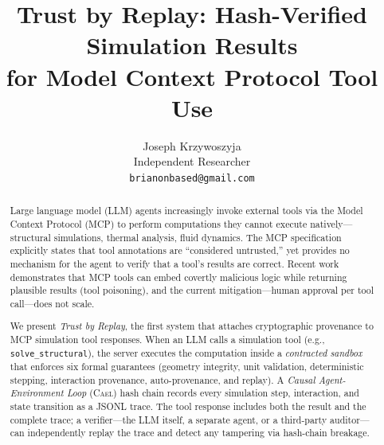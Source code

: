 \documentclass[letterpaper,twocolumn,10pt]{article}
\newcommand{\cael}{\textsc{Cael}}
\begin{document}
\title{\Large \bf Trust by Replay: Hash-Verified Simulation Results\\for Model Context Protocol Tool Use}

\author{
{\rm Joseph Krzywoszyja}\\
Independent Researcher\\
\texttt{brianonbased@gmail.com}
}

\maketitle


\begin{abstract}
Large language model (LLM) agents increasingly invoke external tools via the
Model Context Protocol (MCP) to perform computations they cannot execute
natively---structural simulations, thermal analysis, fluid dynamics. The MCP
specification explicitly states that tool annotations are ``considered
untrusted,'' yet provides no mechanism for the agent to verify that a tool's
results are correct. Recent work demonstrates that MCP tools can embed
covertly malicious logic while returning plausible results (tool poisoning),
and the current mitigation---human approval per tool call---does not scale.

We present \emph{Trust by Replay}, the first system that attaches
cryptographic provenance to MCP simulation tool responses. When an LLM calls
a simulation tool (e.g., \texttt{solve\_structural}), the server executes the
computation inside a \emph{contracted sandbox} that enforces six formal
guarantees (geometry integrity, unit validation, deterministic stepping,
interaction provenance, auto-provenance, and replay). A \emph{Causal
Agent-Environment Loop} (\cael{}) hash chain records every simulation step,
interaction, and state transition as a JSONL trace. The tool response includes
both the result and the complete trace; a verifier---the LLM itself, a
separate agent, or a third-party auditor---can independently replay the trace
and detect any tampering via hash-chain breakage.


\end{abstract}
\end{document}
